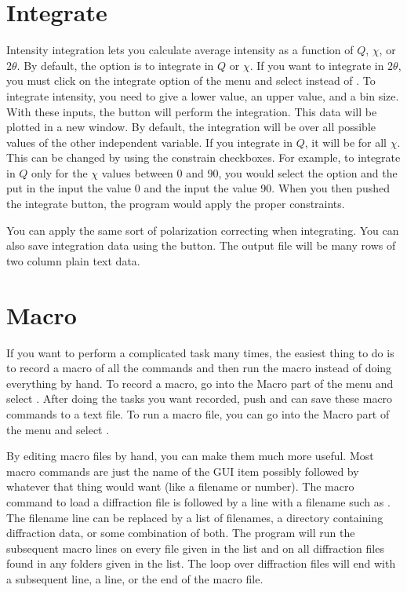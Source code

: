 \section{Integrate}
Intensity integration lets you calculate average intensity
as a function of $Q$, $\chi$, or $2\theta$. By default, the
option is to integrate in $Q$ or $\chi$. If you want to 
integrate in $2\theta$, you must click on the integrate 
option of the menu and select  instead
of . To integrate intensity, you need to
give a lower value, an upper value, and a bin size. With 
these inputs, the  button will perform the
integration. This data will be plotted in a new window.
By default, the integration will be over all possible values
of the other independent variable. If you integrate in $Q$,
it will be for all $\chi$. This can be changed by using the
constrain checkboxes. For example, to integrate in $Q$ only
for the $\chi$ values between 0 and 90, you would select the
 option and the put in
the  input the value 0 and the 
input the value 90.  When you then pushed the integrate button, 
the program would apply the proper constraints.

You can apply the same sort of polarization correcting when 
integrating. You can also save integration data using the
 button. The output file will be many rows
of two column plain text data. 

\section{Macro}
If you want to perform a complicated task many times, the
easiest thing to do is to record a macro of all the commands
and then run the macro instead of doing everything by hand.
To record a macro, go into the Macro part of the menu and
select . After doing the tasks you
want recorded, push  and can save 
these macro commands to a text file. To run a macro file,
you can go into the Macro part of the menu and select
. 

By editing macro files by hand, you can make them much more
useful. Most macro commands are just the name of the GUI item
possibly followed by whatever that thing would want (like a 
filename or number). The macro command to load a diffraction 
file is  followed by a line with a
filename such as .
The filename line can be replaced by a list of filenames,
a directory containing diffraction data, or some combination
of both. The program will run the subsequent macro lines on
every file given in the list and on all diffraction files found 
in any folders given in the list. The loop over diffraction
files will end with a subsequent  line,
a  line, or the end of the macro file.


